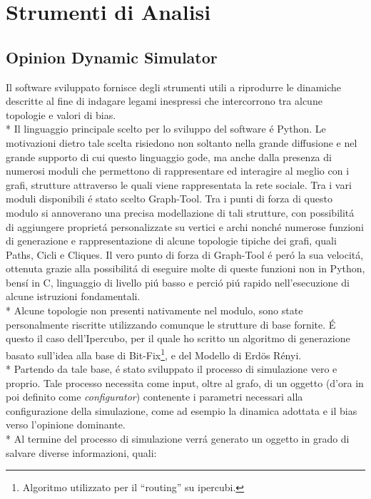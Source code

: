 \documentclass[../Tesi.tex]{subfiles}
\begin{document}
\chapter{Strumenti di Analisi}
\section{Opinion Dynamic Simulator}
Il software sviluppato fornisce degli strumenti utili a riprodurre le dinamiche descritte al fine di indagare legami inespressi che intercorrono tra alcune topologie e valori di bias.\\*
Il linguaggio principale scelto per lo sviluppo del software \'e Python. Le motivazioni dietro tale scelta risiedono non soltanto nella grande diffusione e nel grande supporto di cui questo linguaggio gode, ma anche dalla presenza di numerosi moduli che permettono di rappresentare ed interagire al meglio con i grafi, strutture attraverso le quali viene rappresentata la rete sociale.
Tra i vari moduli disponibili \'e stato scelto Graph-Tool. Tra i punti di forza di questo modulo si annoverano una precisa modellazione di tali strutture, con possibilit\'a di aggiungere propriet\'a personalizzate su vertici e archi nonch\'e numerose funzioni di generazione e rappresentazione di alcune topologie tipiche dei grafi, quali Paths, Cicli e Cliques. Il vero punto di forza di Graph-Tool \'e per\'o la sua velocit\'a, ottenuta grazie alla possibilit\'a di eseguire molte di queste funzioni non in Python, bens\'i in C, linguaggio di livello pi\'u basso e perci\'o pi\'u rapido nell'esecuzione di alcune istruzioni fondamentali.\\*
Alcune topologie non presenti nativamente nel modulo, sono state personalmente riscritte utilizzando comunque le strutture di base fornite. \'E questo il caso dell'Ipercubo, per il quale ho scritto un algoritmo di generazione basato sull'idea alla base di Bit-Fix\footnote{Algoritmo utilizzato per il ``routing'' su ipercubi.}, e del Modello di Erd{\"o}s R\'enyi. \cite{Erdos:1959:pmd}\\*
Partendo da tale base, \'e stato sviluppato il processo di simulazione vero e proprio. Tale processo necessita come input, oltre al grafo, di un oggetto (d'ora in poi definito come \emph{configurator}) contenente i parametri necessari alla configurazione della simulazione, come ad esempio la dinamica adottata e il bias verso l'opinione dominante.\\* 
Al termine del processo di simulazione verr\'a generato un oggetto in grado di salvare diverse informazioni, quali:
\end{document}
